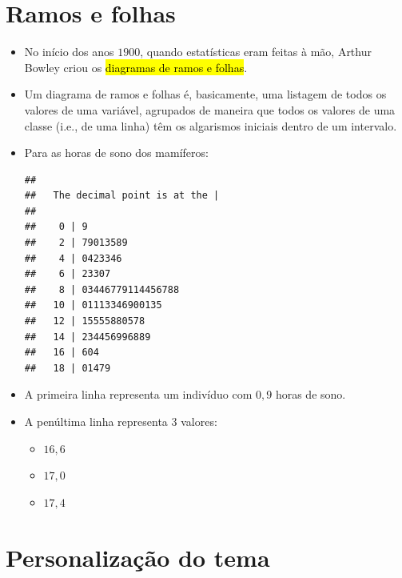 \documentclass[
  11pt]{report}
\newenvironment{Shaded}{\begin{snugshade}}{\end{snugshade}}
\newcommand{\FunctionTok}[1]{\textcolor[rgb]{0.00,0.00,0.00}{#1}}
\newcommand{\NormalTok}[1]{#1}
\newcommand{\SpecialCharTok}[1]{\textcolor[rgb]{0.00,0.00,0.00}{#1}}
\providecommand{\tightlist}{%
  \setlength{\itemsep}{0pt}\setlength{\parskip}{0pt}}
\renewenvironment{Shaded}{
    \begin{mdframed}[%
      roundcorner=2pt,%
      innerleftmargin=5pt,%
      innerrightmargin=5pt,%
      topline=true,%
      leftline=true,%
      rightline=true,%
      bottomline=true,%
      linewidth=0.5pt,%
      linecolor=black!20,%
      backgroundcolor=black!2,%
      skipabove=2ex,%
      skipbelow=2.5ex%
    ]%
  }
  {
    \end{mdframed}
  }
\begin{document}
\hypertarget{ramos-e-folhas}{%
\section{Ramos e folhas}\label{ramos-e-folhas}}

\begin{itemize}
\item
  No início dos anos $1900$, quando estatísticas eram feitas à mão, Arthur Bowley criou os {\hl{diagramas de ramos e folhas}}.
\item
  Um diagrama de ramos e folhas é, basicamente, uma listagem de todos os valores de uma variável, agrupados de maneira que todos os valores de uma classe (i.e., de uma linha) têm os algarismos iniciais dentro de um intervalo.
\item
  Para as horas de sono dos mamíferos:

\begin{Shaded}
\end{Shaded}

\begin{verbatim}
## 
##   The decimal point is at the |
## 
##    0 | 9
##    2 | 79013589
##    4 | 0423346
##    6 | 23307
##    8 | 03446779114456788
##   10 | 01113346900135
##   12 | 15555880578
##   14 | 234456996889
##   16 | 604
##   18 | 01479
\end{verbatim}
\item
  A primeira linha representa um indivíduo com $0{,}9$ horas de sono.
\item
  A penúltima linha representa $3$ valores:

  \begin{itemize}
  \tightlist
  \item
    $16{,}6$
  \item
    $17{,}0$
  \item
    $17{,}4$
  \end{itemize}
\end{itemize}

\hypertarget{personalizauxe7uxe3o-do-tema}{%
\section{Personalização do tema}\label{personalizauxe7uxe3o-do-tema}}
\end{document}
